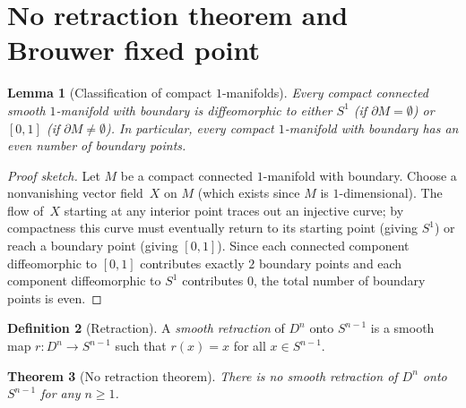 \documentclass[12pt,a4paper,openany]{book}
\newtheorem{theorem}{Theorem}[section]
\newtheorem{lemma}[theorem]{Lemma}
\theoremstyle{definition}
\newtheorem{definition}[theorem]{Definition}
\theoremstyle{remark}
\begin{document}
\section{No retraction theorem and Brouwer fixed point}\label{sec:brouwer}

\begin{lemma}[Classification of compact $1$-manifolds]\label{lem:compact-1-mfd}
Every compact connected smooth $1$-manifold with boundary is
diffeomorphic to either $S^1$ (if $\partial M = \emptyset$) or $[0,1]$
(if $\partial M\ne\emptyset$).  In particular, every compact
$1$-manifold with boundary has an even number of boundary points.
\end{lemma}

\begin{proof}[Proof sketch]
Let $M$ be a compact connected $1$-manifold with boundary.  Choose a
nonvanishing vector field~$X$ on $M$ (which exists since $M$ is
$1$-dimensional).  The flow of~$X$ starting at any interior point
traces out an injective curve; by compactness this curve must
eventually return to its starting point (giving $S^1$) or reach a
boundary point (giving $[0,1]$).  Since each connected component
diffeomorphic to $[0,1]$ contributes exactly $2$ boundary points and
each component diffeomorphic to $S^1$ contributes $0$, the total
number of boundary points is even.
\end{proof}

\begin{definition}[Retraction]\label{def:retraction}
A \emph{smooth retraction} of $D^n$ onto $S^{n-1}$ is a smooth map
$r\colon D^n\to S^{n-1}$ such that $r(x) = x$ for all $x\in S^{n-1}$.
\end{definition}

\begin{theorem}[No retraction theorem]\label{thm:no-retraction}
There is no smooth retraction of $D^n$ onto $S^{n-1}$ for any $n\ge 1$.
\end{theorem}
\end{document}
